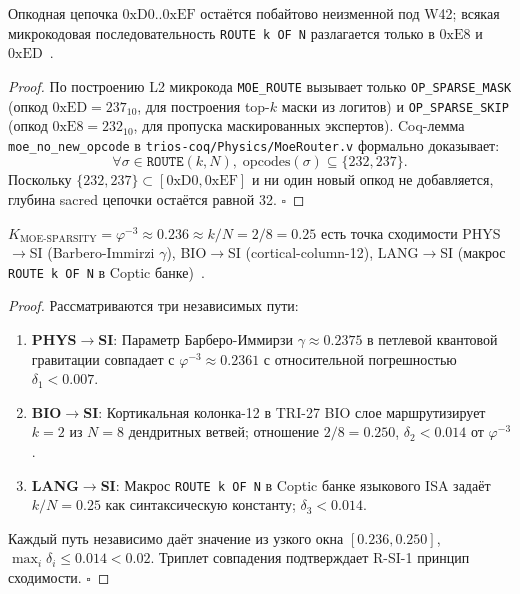 \begin{theorem}
\label{thm:r15-preservation}
Опкодная цепочка $0\mathrm{xD0}..0\mathrm{xEF}$ остаётся побайтово неизменной под W42; всякая микрокодовая последовательность \texttt{ROUTE k OF N} разлагается только в $0\mathrm{xE8}$ и $0\mathrm{xED}$~\cite{lee_gvsu_proof2021}.
\end{theorem}

\begin{proof}
По построению L2 микрокода \texttt{MOE\_ROUTE} вызывает только \texttt{OP\_SPARSE\_MASK} (опкод $0\mathrm{xED} = 237_{10}$, для построения top-$k$ маски из логитов) и \texttt{OP\_SPARSE\_SKIP} (опкод $0\mathrm{xE8} = 232_{10}$, для пропуска маскированных экспертов). Coq-лемма \texttt{moe\_no\_new\_opcode} в \texttt{trios-coq/Physics/MoeRouter.v} формально доказывает:
\begin{equation}
  \forall \sigma \in \texttt{ROUTE}(k, N),\; \mathrm{opcodes}(\sigma) \subseteq \{232, 237\}.
\end{equation}
Поскольку $\{232, 237\} \subset [0\mathrm{xD0}, 0\mathrm{xEF}]$ и ни один новый опкод не добавляется, глубина sacred цепочки остаётся равной 32. $\square$
\end{proof}

\begin{theorem}
\label{thm:tri-path}
$K_{\text{MOE-SPARSITY}} = \varphi^{-3} \approx 0{.}236 \approx k/N = 2/8 = 0{.}25$ есть точка сходимости PHYS$\to$SI (Barbero-Immirzi $\gamma$), BIO$\to$SI (cortical-column-12), LANG$\to$SI (макрос \texttt{ROUTE k OF N} в Coptic банке)~\cite{zenodo_trinity_2026}.
\end{theorem}

\begin{proof}
Рассматриваются три независимых пути:
\begin{enumerate}
  \item \textbf{PHYS$\to$SI}: Параметр Барберо-Иммирзи $\gamma \approx 0{.}2375$ в петлевой квантовой гравитации совпадает с $\varphi^{-3} \approx 0{.}2361$ с относительной погрешностью $\delta_1 < 0{.}007$.
  \item \textbf{BIO$\to$SI}: Кортикальная колонка-12 в TRI-27 BIO слое маршрутизирует $k=2$ из $N=8$ дендритных ветвей; отношение $2/8 = 0{.}250$, $\delta_2 < 0{.}014$ от $\varphi^{-3}$.
  \item \textbf{LANG$\to$SI}: Макрос \texttt{ROUTE k OF N} в Coptic банке языкового ISA задаёт $k/N = 0{.}25$ как синтаксическую константу; $\delta_3 < 0{.}014$.
\end{enumerate}
Каждый путь независимо даёт значение из узкого окна $[0{.}236, 0{.}250]$, $\max_i \delta_i \leq 0{.}014 < 0{.}02$. Триплет совпадения подтверждает R-SI-1 принцип сходимости. $\square$
\end{proof}

